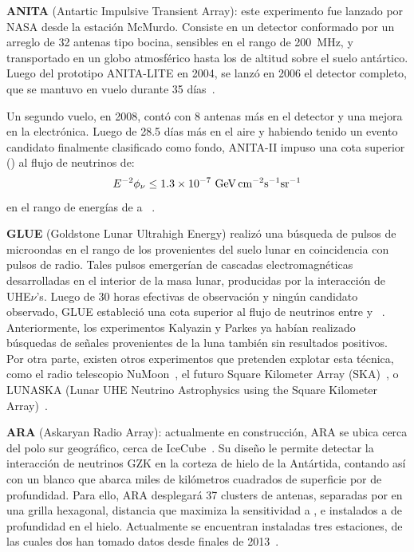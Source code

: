 	\textbf{ANITA} (Antartic Impulsive Transient Array): este experimento fue lanzado por NASA desde la estaci\'on McMurdo. 
	Consiste en un detector conformado por un arreglo de 32 antenas tipo bocina, sensibles en el rango de 200~MHz, y transportado en un globo atmosf\'erico hasta los  de altitud sobre el suelo ant\'artico.
	Luego del prototipo ANITA-LITE en 2004, se lanzó en 2006 el detector completo, que se mantuvo en vuelo durante 35 d\'ias~\cite{cite:Anita1}.
	 
	Un segundo vuelo, en 2008, cont\'o con 8 antenas m\'as en el detector y una mejora en la electr\'onica.
	Luego de 28.5 d\'ias m\'as en el aire y habiendo tenido un evento candidato finalmente clasificado como fondo, ANITA-II impuso una cota superior () al flujo de neutrinos de:
	\begin{equation}
	 E^{-2}\phi_\nu \leq 1.3\times10^{-7}{\rm\ GeV\,cm^{-2}s^{-1}sr^{-1}}
	\end{equation}
	en el rango de energ\'ias de  a ~\cite{cite:Anita2}.
	
	\textbf{GLUE} (Goldstone Lunar Ultrahigh Energy) realiz\'o una b\'usqueda de pulsos de microondas en el rango de los  provenientes del suelo lunar en coincidencia con pulsos de radio. 
	Tales pulsos emerger\'ian de cascadas electromagn\'eticas desarrolladas en el interior de la masa lunar, producidas por la interacci\'on de UHE$\nu$'s. 
	Luego de 30 horas efectivas de observaci\'on y ningún candidato observado, GLUE estableci\'o una cota superior al flujo de neutrinos entre  y ~\cite{cite:Glue}.
	Anteriormente, los experimentos Kalyazin \cite{cite:Kalazin} y Parkes \cite{cite:Parkes} ya hab\'ian realizado b\'usquedas de se\~nales provenientes de la luna tambi\'en sin resultados positivos.
	Por otra parte, existen otros experimentos que pretenden explotar esta t\'ecnica, como el radio telescopio NuMoon~\cite{cite:NuMoon}, el futuro Square Kilometer Array (SKA)~\cite{cite:SKA}, o LUNASKA (Lunar UHE Neutrino Astrophysics using the Square Kilometer Array)~\cite{cite:LUNASKA}.
	
	\textbf{ARA} (Askaryan Radio Array): actualmente en construcci\'on, ARA se ubica cerca del polo sur geogr\'afico, cerca de IceCube~\cite{cite:ARA}.
	Su dise\~no le permite detectar la interacci\'on de neutrinos GZK en la corteza de hielo de la Ant\'artida, contando as\'i con un blanco que abarca miles de kil\'ometros cuadrados de superficie por  de profundidad.
	Para ello, ARA desplegar\'a 37 clusters de antenas, separadas por  en una grilla hexagonal, distancia que maximiza la sensitividad a , e instalados a  de profundidad en el hielo.
	Actualmente se encuentran instaladas tres estaciones, de las cuales dos han tomado datos desde finales de 2013~\cite{cite:ARA2}.
	
